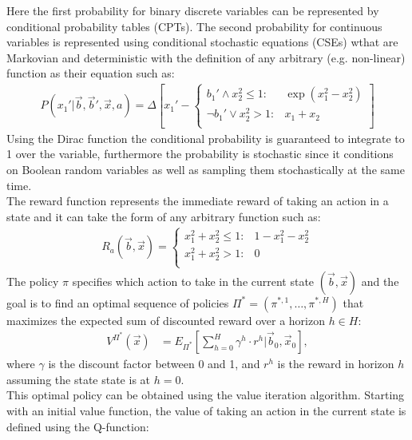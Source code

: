 \documentclass[letterpaper]{article}
\renewcommand{\-}{\text{-}}
\begin{document}
Here the first probability for binary discrete variables can be represented by conditional probability tables (CPTs). The second probability for continuous variables is represented using conditional stochastic equations (CSEs) wthat are Markovian and deterministic with the definition of any arbitrary (e.g. non-linear) function as their equation such as:
\vspace{-3mm}
{\footnotesize
\begin{align}
P(x_1' | \vec{b},\vec{b}',\vec{x},a) = \Delta\left[ x_1' - 
\begin{cases}
b_1' \land x_2^2 \leq 1 : & \exp(x_1^2 - x_2^2) \\
\neg b_1' \lor  x_2^2 > 1 : & x_1 + x_2 \\
\end{cases}
\right] \label{eq:ex_csde}
\end{align}}
Using the Dirac function the conditional probability is guaranteed to integrate to 1 over the variable, furthermore the probability is stochastic since it conditions on Boolean random variables as well as sampling them stochastically at the same time. \\
The reward function represents the immediate reward of taking an action in a state and it can take the form of any arbitrary function such as:
\begin{align}
R_a(\vec{b},\vec{x}) = \begin{cases}
x_1^2 + x_2^2 \leq 1 : & 1 - x_1^2 - x_2^2  \\
x_1^2 + x_2^2 > 1 : & 0 \\
\end{cases} \label{eq:simple_reward}
\end{align}
The policy $\pi$ specifies which action to take in the current state  $(\vec{b},\vec{x})$ and the goal is to find an optimal sequence of policies
$\Pi^* = (\pi^{*,1},\ldots,\pi^{*,H})$ that maximizes the expected sum of discounted reward over a horizon $h \in H $: \\

\begin{align}
V^{\Pi^*}(\vec{x}) & = E_{\Pi^*} \left[ \sum_{h=0}^{H} \gamma^h \cdot r^h \Big| \vec{b}_0,\vec{x}_0 \right], \label{eq:vfun_def}
\end{align}
where $\gamma$ is the discount factor between 0 and 1, and  $r^h$ is the reward in horizon $h$ assuming the state state is at $h=0$.\\
This optimal policy can be obtained using the value iteration algorithm. Starting  with an initial value function, the value of taking an action in the current state is defined using the Q-function:  
\end{document}
